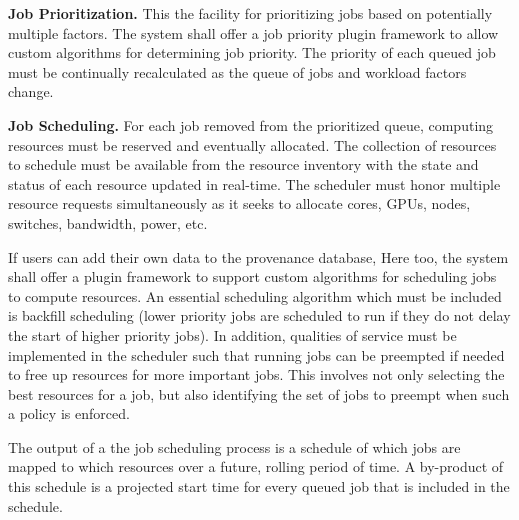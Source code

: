 \textbf{Job Prioritization.}  This the facility for prioritizing jobs
based on potentially multiple factors.  The system shall offer a job
priority plugin framework to allow custom algorithms for determining
job priority.  The priority of each queued job must be continually
recalculated as the queue of jobs and workload factors change.

\textbf{Job Scheduling.} For each job removed from the prioritized
queue, computing resources must be reserved and eventually allocated.
The collection of resources to schedule must be available from the
resource inventory with the state and status of each resource updated
in real-time.  The scheduler must honor multiple resource requests
simultaneously as it seeks to allocate cores, GPUs, nodes, switches,
bandwidth, power, etc.

\ifcomments
{}
\fi
If users can add their own data to the provenance database,
Here too, the system shall offer a plugin framework to support custom
algorithms for scheduling jobs to compute resources.  An essential
scheduling algorithm which must be included is backfill scheduling
(lower priority jobs are scheduled to run if they do not delay the
start of higher priority jobs).  In addition, qualities of service must
be implemented in the scheduler such that running jobs can be
preempted if needed to free up resources for more important jobs.
This involves not only selecting the best resources for a job, but
also identifying the set of jobs to preempt when such a policy is
enforced.

The output of a the job scheduling process is a schedule of which jobs
are mapped to which resources over a future, rolling period of time.
A by-product of this schedule is a projected start time for every
queued job that is included in the schedule.



